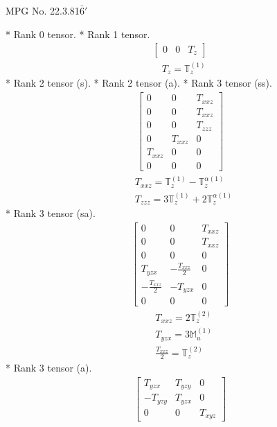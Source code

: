 \documentclass[fleqn,8pt,landscape]{jsarticle}
\begin{document}
\setcounter{MaxMatrixCols}{32}

\renewcommand{\tablename}{Table~}
\renewcommand{\figurename}{Figure~}
\begin{center}
\LARGE
MPG No. 22.3.81\quad$\bar{6}'$
\end{center}
* Rank 0 tensor.
* Rank 1 tensor.
\begin{align*}
\begin{bmatrix} 0 & 0 & T_{z} \end{bmatrix}
\end{align*}
\begin{align*}
& T_{z} = \mathbb{T}_{z}^{(1)}
\end{align*}
* Rank 2 tensor (s).
* Rank 2 tensor (a).
* Rank 3 tensor (ss).
\begin{align*}
\begin{bmatrix} 0 & 0 & T_{xxz} \\ 0 & 0 & T_{xxz} \\ 0 & 0 & T_{zzz} \\ 0 & T_{xxz} & 0 \\ T_{xxz} & 0 & 0 \\ 0 & 0 & 0 \end{bmatrix}
\end{align*}
\begin{align*}
& T_{xxz} = \mathbb{T}_{z}^{(1)} - \mathbb{T}_{z}^{\alpha(1)} \\
& T_{zzz} = 3 \mathbb{T}_{z}^{(1)} + 2 \mathbb{T}_{z}^{\alpha(1)}
\end{align*}
* Rank 3 tensor (sa).
\begin{align*}
\begin{bmatrix} 0 & 0 & T_{xxz} \\ 0 & 0 & T_{xxz} \\ 0 & 0 & 0 \\ T_{yzx} & - \frac{T_{xxz}}{2} & 0 \\ - \frac{T_{xxz}}{2} & - T_{yzx} & 0 \\ 0 & 0 & 0 \end{bmatrix}
\end{align*}
\begin{align*}
& T_{xxz} = 2 \mathbb{T}_{z}^{(2)} \\
& T_{yzx} = 3 \mathbb{M}_{u}^{(1)} \\
& \frac{T_{xxz}}{2} = \mathbb{T}_{z}^{(2)}
\end{align*}
* Rank 3 tensor (a).
\begin{align*}
\begin{bmatrix} T_{yzx} & T_{yzy} & 0 \\ - T_{yzy} & T_{yzx} & 0 \\ 0 & 0 & T_{xyz} \end{bmatrix}
\end{align*}
\end{document}
